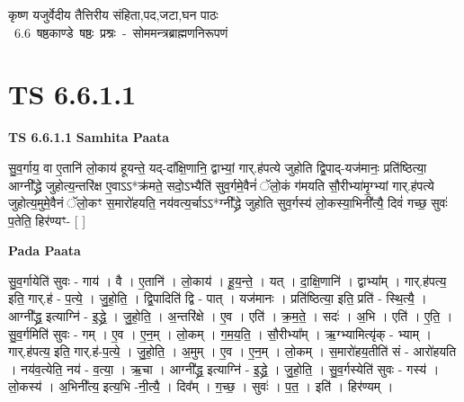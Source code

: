 \documentclass[17pt]{extarticle}
\begin{document}
\begin{titlepage}
    \begin{center}
 
\begin{sanskrit}
    { \Huge
    कृष्ण यजुर्वेदीय तैत्तिरीय संहिता,पद,जटा,घन पाठः 
    }
    \\
    \vspace{2.5cm}
    \mbox{ \Huge
    6.6       षष्ठकाण्डे षष्ठः प्रश्नः - सोममन्त्रब्राह्मणनिरूपणं   }
\end{sanskrit}
\end{center}

\end{titlepage}
\tableofcontents
\pagebreak

\section*{ TS 6.6.1.1 }

\textbf{TS 6.6.1.1 } \newline
\textbf{Samhita Paata} \newline

सु॒व॒र्गाय॒ वा ए॒तानि॑ लो॒काय॑ हूयन्ते॒ यद्-दा᳚क्षि॒णानि॒ द्वाभ्यां॒ गार्.ह॑पत्ये जुहोति द्वि॒पाद्-यज॑मानः॒ प्रति॑ष्ठित्या॒ आग्नी᳚द्ध्रे जुहोत्य॒न्तरि॑क्ष ए॒वाऽऽ*क्र॑मते॒ सदो॒ऽभ्यैति॑ सुव॒र्गमे॒वैनं॑ ॅलो॒कं ग॑मयति सौ॒रीभ्या॑मृ॒ग्भ्यां गार्.ह॑पत्ये जुहोत्य॒मुमे॒वैनं ॅलो॒कꣳ स॒मारो॑हयति॒ नय॑वत्य॒र्चाऽऽ*ग्नी᳚द्ध्रे जुहोति सुव॒र्गस्य॑ लो॒कस्या॒भिनी᳚त्यै॒ दिवं॑ गच्छ॒ सुवः॑ प॒तेति॒ हिर॑ण्यꣳ- [  ] \newline

\textbf{Pada Paata} \newline

सु॒व॒र्गायेति॑ सुवः - गाय॑ । वै । ए॒तानि॑ । लो॒काय॑ । हू॒य॒न्ते॒ । यत् । दा॒क्षि॒णानि॑ । द्वाभ्या᳚म् । गार्.ह॑पत्य॒ इति॒ गार्.ह॑ - प॒त्ये॒ । जु॒हो॒ति॒ । द्वि॒पादिति॑ द्वि - पात् । यज॑मानः । प्रति॑ष्ठित्या॒ इति॒ प्रति॑ - स्थि॒त्यै॒ । आग्नी᳚द्ध्र॒ इत्याग्नि॑ - इ॒द्ध्रे॒ । जु॒हो॒ति॒ । अ॒न्तरि॑क्षे । ए॒व । एति॑ । क्र॒म॒ते॒ । सदः॑ । अ॒भि । एति॑ । ए॒ति॒ । सु॒व॒र्गमिति॑ सुवः - गम् । ए॒व । ए॒न॒म् । लो॒कम् । ग॒म॒य॒ति॒ । सौ॒रीभ्या᳚म् । ऋ॒ग्भ्यामित्यृ॑क् - भ्याम् । गार्.ह॑पत्य॒ इति॒ गार्.ह॑-प॒त्ये॒ । जु॒हो॒ति॒ । अ॒मुम् । ए॒व । ए॒न॒म् । लो॒कम् । स॒मारो॑हय॒तीति॑ सं - आरो॑हयति । नय॑व॒त्येति॒ नय॑ - व॒त्या॒ । ऋ॒चा । आग्नी᳚द्ध्र॒ इत्याग्नि॑ - इ॒द्ध्रे॒ । जु॒हो॒ति॒ । सु॒व॒र्गस्येति॑ सुवः - गस्य॑ । लो॒कस्य॑ । अ॒भिनी᳚त्य॒ इत्य॒भि -नी॒त्यै॒ । दिव᳚म् । ग॒च्छ॒ । सुवः॑ । प॒त॒ । इति॑ । हिर॑ण्यम् ।  \newline
\end{document}
